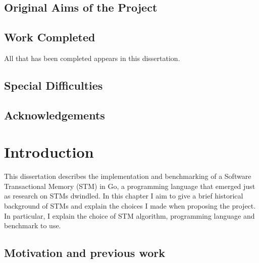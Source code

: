 \documentclass[12pt,a4paper,twoside,openright]{report}
\begin{document}
\section*{Original Aims of the Project}

\section*{Work Completed}

All that has been completed appears in this dissertation.

\section*{Special Difficulties}
 
\tableofcontents

\pagestyle{plain} 

\listoffigures{}

\listoftables{}


\newpage

\section*{Acknowledgements}



\pagestyle{headings}


\chapter{Introduction}


This dissertation describes the implementation and benchmarking of a
Software Transactional Memory (STM) in Go, a programming language that
emerged just as research on STMs dwindled. In this chapter I aim to
give a brief historical background of STMs and explain the choices I
made when proposing the project. In particular, I explain the choice
of STM algorithm, programming language and benchmark to use.

\section{Motivation and previous work}
\label{sec:motivation}
\end{document}
